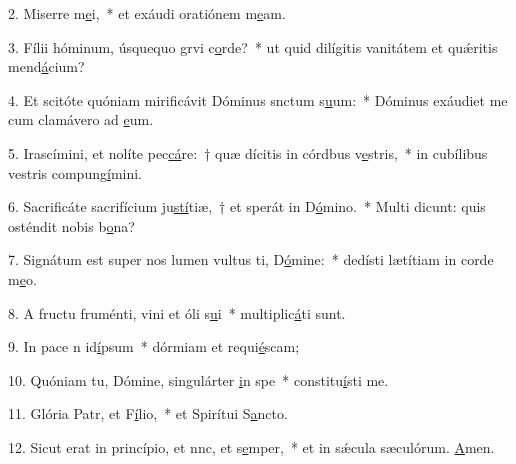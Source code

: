 2. Miserre m\uline{e}i,~* et exáudi oratiónem m\uline{e}am.\par 
3. Fílii hóminum, úsquequo grvi c\uline{o}rde?~* ut quid dilígitis vanitátem et quǽritis mend\uline{á}cium?\par 
4. Et scitóte quóniam mirificávit Dóminus snctum s\uline{u}um:~* Dóminus exáudiet me cum clamávero ad \uline{e}um.\par 
5. Irascímini, et nolíte pec\uline{cá}re:~† quæ dícitis in córdbus v\uline{e}stris,~* in cubílibus vestris compung\uline{í}mini.\par 
6. Sacrificáte sacrifícium ju\uline{stí}tiæ,~† et sperát in D\uline{ó}mino.~* Multi dicunt: quis osténdit nobis b\uline{o}na?\par 
7. Signátum est super nos lumen vultus ti, D\uline{ó}mine:~* dedísti lætítiam in corde m\uline{e}o.\par 
8. A fructu fruménti, vini et óli s\uline{u}i~* multiplic\uline{á}ti sunt.\par 
9. In pace n id\uline{í}psum~* dórmiam et requi\uline{é}scam;\par 
10. Quóniam tu, Dómine, singulárter \uline{i}n spe~* constitu\uline{í}sti me.\par 
11. Glória Patr, et F\uline{í}lio,~* et Spirítui S\uline{a}ncto.\par 
12. Sicut erat in princípio, et nnc, et s\uline{e}mper,~* et in sǽcula sæculórum. \uline{A}men.\par 
